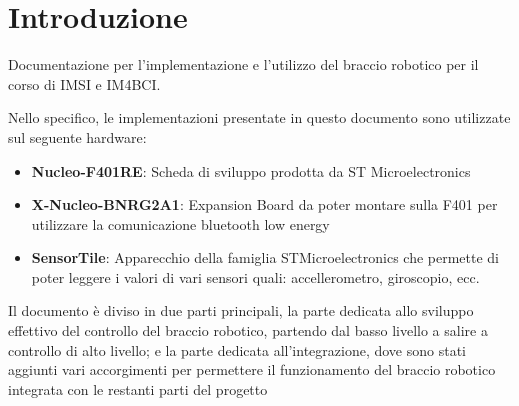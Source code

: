 \chapter*{Introduzione}

Documentazione per l'implementazione e l'utilizzo del braccio robotico per il corso di IMSI e IM4BCI.

Nello specifico, le implementazioni presentate in questo documento sono utilizzate sul seguente hardware:
\begin{itemize}
    \item \textbf{Nucleo-F401RE}: Scheda di sviluppo prodotta da ST Microelectronics
    \item \textbf{X-Nucleo-BNRG2A1}: Expansion Board da poter montare sulla F401 per utilizzare la comunicazione bluetooth low energy
    \item \textbf{SensorTile}: Apparecchio della famiglia STMicroelectronics che permette di poter leggere i valori di vari sensori quali: accellerometro, giroscopio, ecc.
\end{itemize}

Il documento è diviso in due parti principali, la parte dedicata allo sviluppo effettivo del controllo del braccio robotico, partendo dal basso livello a salire a controllo di alto livello; e la parte dedicata all'integrazione, dove sono stati aggiunti vari accorgimenti per permettere il funzionamento del braccio robotico integrata con le restanti parti del progetto
